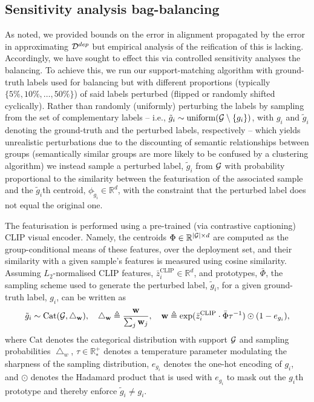 {\subsection{Sensitivity analysis \wrt{} bag-balancing}
%
As noted, we provided bounds on the error in alignment propagated by the error in
approximating \( {\mathcal{D}}^{dep}\) but empirical analysis of the reification of this is lacking. 
%
Accordingly, we have sought to effect this via controlled sensitivity analyses \wrt{} the
balancing.
To achieve this, we run our support-matching algorithm with ground-truth labels used for balancing
but with different proportions (typically \( \{5\%, 10\%, \dots, 50\%\} \)) of said labels
perturbed (flipped or randomly shifted cyclically). 
%
Rather than randomly (uniformly) perturbing the labels by sampling from the set of complementary
labels -- i.e., \( \tilde{g}_i \sim \mathrm{uniform}({\mathcal{G}} \setminus \{g_i\}) \), with \( g_i \) and
\( \tilde{g}_i \) denoting the ground-truth and the perturbed labels, respectively -- which yields
unrealistic perturbations due to the discounting of semantic relationships between groups
(semantically similar groups are more likely to be confused by a clustering algorithm) we instead
sample a perturbed label, $\tilde{g}_i$ from ${\mathcal{G}}$ with probability proportional to the similarity
between the featurisation of the associated sample and the \(\tilde{g}_i\)th centroid, \(
\phi_{\tilde{g}_i} \in \mathbb{R}^d \), with the constraint that the perturbed label does not equal
the original one. 

%
The featurisation is performed using a pre-trained (via contrastive captioning) CLIP
\citep{radford2021learning} visual encoder. 
%
Namely, the centroids \( \Phi \in \mathbb{R}^{|{\mathcal{G}}| \times d} \) are computed as the
group-conditional means of these features, over the deployment set, and their similarity with a
given sample's features is measured using cosine similarity. 
%
Assuming \(L_2\)-normalised CLIP features, $\bar z_i^\text{CLIP} \in \mathbb{R}^d$, and prototypes,
$\bar \Phi$, the sampling scheme used to generate the perturbed label, $\tilde{g}_i$, for a given
ground-truth label, $g_i$, can be written as
%
\begin{align}
  \tilde{g}_i \sim \text{Cat}({\mathcal{G}}, \bigtriangleup_\mathbf{w} ), \quad
  \bigtriangleup_\mathbf{w} \triangleq  \frac{\mathbf{w}}{\sum_j \mathbf{w}_j} , \quad
  \mathbf{w} \triangleq \text{exp}(\bar z_i^\text{CLIP} \cdot \bar \Phi \tau^{-1})
  \odot (1 - e_{g_i}),
\end{align}
%
where \( \text{Cat} \) denotes the categorical distribution with support \({\mathcal{G}}\) and sampling
probabilities \( \bigtriangleup_w \), \( \tau \in \mathbb{R}^+_\ast \) denotes a temperature
parameter modulating the sharpness of the sampling distribution, \(e_{g_i}\) denotes the one-hot
encoding of \(g_i\), and \(\odot\) denotes the Hadamard product that is used with \(e_{g_i}\) to
mask out the \(g_i\)th prototype and thereby enforce \( \tilde{g}_i \neq g_i \).
%
}

